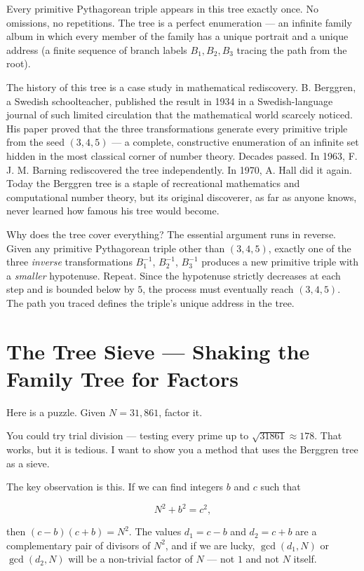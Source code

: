 \documentclass[11pt,twoside,openright]{book}
\theoremstyle{definition}
\theoremstyle{remark}
\begin{document}
Every primitive Pythagorean triple appears in this tree exactly once. No omissions, no repetitions. The tree is a perfect enumeration --- an infinite family album in which every member of the family has a unique portrait and a unique address (a finite sequence of branch labels $B_1, B_2, B_3$ tracing the path from the root).


The history of this tree is a case study in mathematical rediscovery. B. Berggren, a Swedish schoolteacher, published the result in 1934 in a Swedish-language journal of such limited circulation that the mathematical world scarcely noticed. His paper proved that the three transformations generate every primitive triple from the seed $(3, 4, 5)$ --- a complete, constructive enumeration of an infinite set hidden in the most classical corner of number theory. Decades passed. In 1963, F. J. M. Barning rediscovered the tree independently. In 1970, A. Hall did it again. Today the Berggren tree is a staple of recreational mathematics and computational number theory, but its original discoverer, as far as anyone knows, never learned how famous his tree would become.

Why does the tree cover everything? The essential argument runs in reverse. Given any primitive Pythagorean triple other than $(3, 4, 5)$, exactly one of the three \textit{inverse} transformations $B_1^{-1}$, $B_2^{-1}$, $B_3^{-1}$ produces a new primitive triple with a \textit{smaller} hypotenuse. Repeat. Since the hypotenuse strictly decreases at each step and is bounded below by $5$, the process must eventually reach $(3, 4, 5)$. The path you traced defines the triple's unique address in the tree.


\section{The Tree Sieve --- Shaking the Family Tree for Factors}

Here is a puzzle. Given $N = 31{,}861$, factor it.

You could try trial division --- testing every prime up to $\sqrt{31861} \approx 178$. That works, but it is tedious. I want to show you a method that uses the Berggren tree as a sieve.

The key observation is this. If we can find integers $b$ and $c$ such that

\[N^2 + b^2 = c^2,\]

then $(c - b)(c + b) = N^2$. The values $d_1 = c - b$ and $d_2 = c + b$ are a complementary pair of divisors of $N^2$, and if we are lucky, $\gcd(d_1, N)$ or $\gcd(d_2, N)$ will be a non-trivial factor of $N$ --- not $1$ and not $N$ itself.
\end{document}
